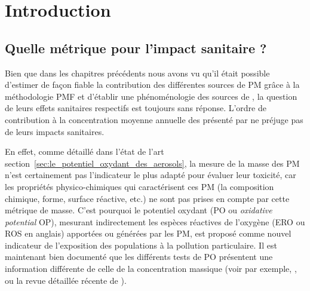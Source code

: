 \section{Introduction}%
\label{sec:intro_PO}

\subsection{Quelle métrique pour l'impact sanitaire ?}%
\label{sub:quelle_métrique_pour_l_impact_sanitaire_}


Bien que dans les chapitres précédents nous avons vu qu'il était possible d'estimer de
façon fiable la contribution des différentes sources de PM grâce à la méthodologie PMF et
d'établir une phénoménologie des sources de \PMdix, la question de leurs effets sanitaires
respectifs est toujours sans réponse. L'ordre de contribution à la concentration
moyenne annuelle des \PMdix{} présenté par \cite[(figure 3)]{weberComparison2019} ne
préjuge pas de leurs impacts sanitaires.

En effet, comme détaillé dans l'état de l'art
section~\ref{sec:le_potentiel_oxydant_des_aerosols}, la mesure de la masse des PM n'est
certainement pas l'indicateur le plus adapté pour évaluer leur toxicité, car les
propriétés physico-chimiques qui caractérisent ces PM (la composition chimique, forme, surface
réactive, etc.) ne sont pas prises en compte par cette métrique de masse.  C'est pourquoi le
potentiel oxydant (PO ou \textit{oxidative potential} OP), mesurant indirectement les espèces réactives de
l'oxygène (ERO ou ROS en anglais) apportées ou générées par les PM, est proposé comme
nouvel indicateur de l'exposition des populations à la pollution particulaire.  Il est
maintenant bien documenté que les différents tests de PO présentent une information
différente de celle de la concentration massique (voir par exemple,
\cite{choRedox2005,vermaReactive2014,batesReactive2015,fangOxidative2016,fangAmbient2017,calasSeasonal2019},
ou la revue détaillée récente de \cite{batesReview2019}).



